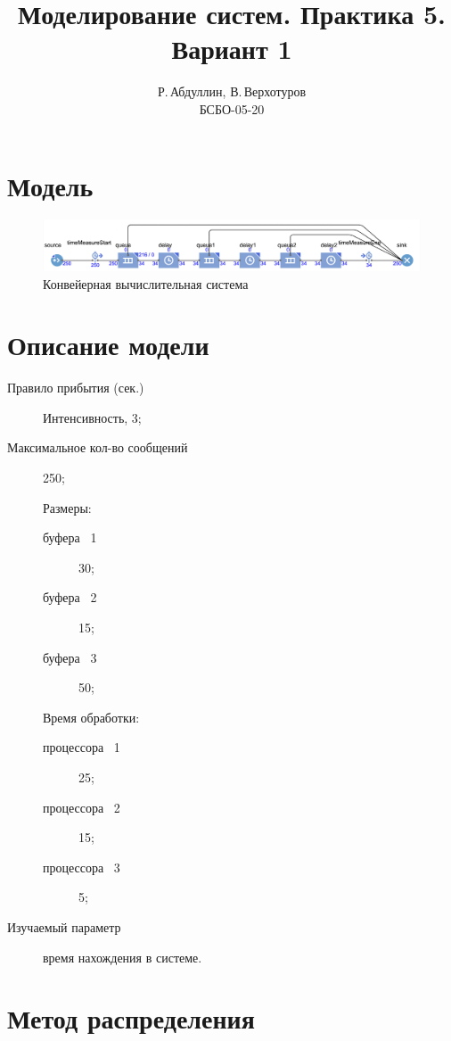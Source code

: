 \documentclass[14pt, a4paper, titlepage]{extarticle}
\title{Моделирование систем. Практика 5. Вариант 1}
\author{Р.\,Абдуллин, В.\,Верхотуров \\  БСБО-05-20}
\affil{РТУ МИРЭА}
\begin{document}
	\maketitle
	
	\section{Модель}
	
	\begin{figure}[H]
		\includegraphics[width=.9\textwidth]{model}
		\caption{Конвейерная вычислительная система}
	\end{figure}
	
	\section{Описание модели}
	
	\begin{description}
		\item[Правило прибытия (сек.)] Интенсивность, 3;
		\item[Максимальное кол-во сообщений] 250;
		\item[] Размеры:
		\begin{description}
			\item[буфера \textnumero~1] 30;
			\item[буфера \textnumero~2] 15;
			\item[буфера \textnumero~3] 50;
		\end{description}
		\item[] Время обработки:
		\begin{description}
			\item[процессора \textnumero~1] 25;
			\item[процессора \textnumero~2] 15;
			\item[процессора \textnumero~3] 5;
			
		\end{description}
		\item[Изучаемый параметр] время нахождения в системе.
	\end{description}
	
	\section{Метод распределения}
	
\end{document}
